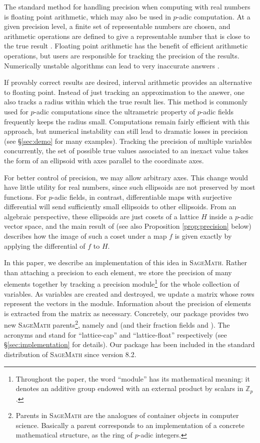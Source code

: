 \documentclass[sigconf]{acmart}
\newcommand{\Z}{\mathbb Z}
\newcommand{\Zp}{\Z_p}
\newcommand{\sage}{\textsc{SageMath}\xspace}
\newcommand{\ZpLC}{\text{\color{output} \rm \tt ZpLC}\xspace}
\newcommand{\ZpLF}{\text{\color{output} \rm \tt ZpLF}\xspace}
\newcommand{\QpLC}{\text{\color{output} \rm \tt QpLC}\xspace}
\newcommand{\QpLF}{\text{\color{output} \rm \tt QpLF}\xspace}
\newcommand{\LC}{\text{\rm \tt LC}\xspace}
\newcommand{\LF}{\text{\rm \tt LF}\xspace}
\theoremstyle{definition}
\begin{document}
The standard method for handling precision when computing with real numbers
is floating point arithmetic, which may also be used in $p$-adic computation.
At a given precision level, a finite set of representable numbers are chosen,
and arithmetic operations are defined to give a representable number
that is close to the true result \cite{ieee754:2008}.  Floating point arithmetic
has the benefit of efficient arithmetic operations, but users are responsible
for tracking the precision of the results.  Numerically unstable algorithms can
lead to very inaccurate answers \cite{higham:2002}.

If provably correct results are desired, interval arithmetic provides
an alternative to floating point.  Instead of just tracking an approximation to the answer,
one also tracks a radius within which the true result lies.
This method is commonly used for $p$-adic computations since
the ultrametric property of $p$-adic fields frequently keeps the radius small.
Computations remain fairly efficient with this approach, but numerical instability
can still lead to dramatic losses in precision (see \S \ref{sec:demo} for many examples).
Tracking the precision of multiple variables concurrently, the set of possible
true values associated to an inexact value takes the form of an ellipsoid
with axes parallel to the coordinate axes.

For better control of precision, we may allow arbitrary axes.  This 
change would have little utility for real numbers, since such ellipsoids 
are not preserved by most functions. For $p$-adic fields, in contrast, 
differentiable maps with surjective differential will send sufficiently 
small ellipsoids to other ellipsoids.  From an algebraic perspective, 
these ellipsoids are just cosets of a lattice $H$ inside a $p$-adic 
vector space, and the main result of \cite{caruso-roe-vaccon:14a} (see 
also Proposition \ref{prop:precision} below) describes how the image of 
such a coset under a map $f$ is given exactly by applying the 
differential of $f$ to $H$.

In this paper, we describe an implementation of this idea in \sage \cite{sage}.
Rather than attaching a precision to each element, we store the precision of
many elements together by tracking a precision module\footnote{Throughout
the paper, the word ``module'' has its mathematical meaning: it denotes 
an additive group endowed with an external product by scalars in $\Zp$.} 
for the whole collection of variables.  As variables are created and 
destroyed, we update a matrix whose rows represent the vectors in the 
module.  Information about the precision of elements is extracted from 
the matrix as necessary.
Concretely, our package provides two new \sage 
parents\footnote{Parents in \sage are the analogues of container objects 
in computer science. Basically a parent corresponds to an implementation
of a concrete mathematical structure, as the ring of $p$-adic integers.}, 
namely \ZpLC and \ZpLF (and their fraction fields \QpLC and \QpLF). The 
acronyms \LC and \LF stand for ``lattice-cap'' and ``lattice-float''
respectively (see \S \ref{sec:implementation} for details). Our package 
has been included in the standard distribution of \sage since version 8.2.
\end{document}
